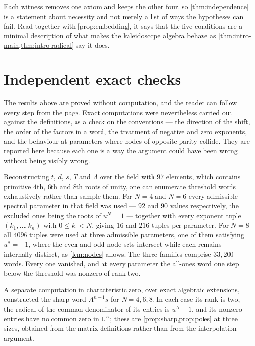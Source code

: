 \documentclass[11pt,reqno]{amsart}
\theoremstyle{plain}
\theoremstyle{definition}
\theoremstyle{remark}
\numberwithin{equation}{section}
\begin{document}
Each witness removes one axiom and keeps the other four, so
\cref{thm:independence} is a statement about necessity and not merely a list of
ways the hypotheses can fail. Read together with \cref{prop:embedding}, it says
that the five conditions are a minimal description of what makes the
kaleidoscope algebra behave as \cref{thm:intro-main,thm:intro-radical} say it
does.

\section{Independent exact checks}
\label{sec:verification}

The results above are proved without computation, and the reader can follow
every step from the page. Exact computations were nevertheless carried out
against the definitions, as a check on the conventions --- the direction of the
shift, the order of the factors in a word, the treatment of negative and zero
exponents, and the behaviour at parameters where nodes of opposite parity
collide. They are reported here because each one is a way the argument could
have been wrong without being visibly wrong.

Reconstructing $t$, $d$, $s$, $T$ and $\Lambda$ over the field with $97$
elements, which contains primitive $4$th, $6$th and $8$th roots of unity, one
can enumerate threshold words exhaustively rather than sample them. For $N=4$
and $N=6$ every admissible spectral parameter in that field was used --- $92$
and $90$ values respectively, the excluded ones being the roots of $u^{N}=1$
--- together with every exponent tuple $(k_{1},\dots,k_{n})$ with
$0\le k_{i}<N$, giving $16$ and $216$ tuples per parameter. For $N=8$ all
$4096$ tuples were used at three admissible parameters, one of them satisfying
$u^{8}=-1$, where the even and odd node sets intersect while each remains
internally distinct, as \cref{lem:nodes} allows. The three families comprise
$33{,}200$ words. Every one vanished, and at every parameter the all-ones word
one step below the threshold was nonzero of rank two.

A separate computation in characteristic zero, over exact algebraic
extensions, constructed the sharp word $A^{n-1}s$ for $N=4,6,8$. In each case
its rank is two, the radical of the common denominator of its entries is
$u^{N}-1$, and its nonzero entries have no common zero in
$\mathbb{C}^{\times}$; these are \cref{prop:sharp,prop:poles} at three sizes,
obtained from the matrix definitions rather than from the interpolation
argument.
\end{document}
